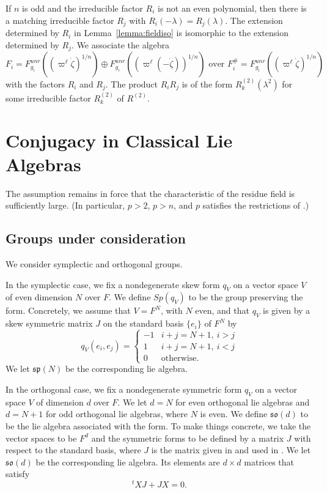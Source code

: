\documentclass[11pt]{amsart}
\theoremstyle{definition}
\theoremstyle{remark}
\numberwithin{equation}{theorem}
\def\lie#1{{\mathfrak{#1}}}
\def\lb{\text{\#}}
\begin{document}
If $n$ is odd and the irreducible factor $R_i$ is not an even
polynomial, then there is a matching irreducible factor $R_j$ with
$R_i(-\lambda)=R_j(\lambda)$.  The extension determined by $R_i$
in Lemma~\ref{lemma:fieldiso} is isomorphic to the extension
determined by $R_j$. We associate the algebra
   \begin{equation}
   F_i = F^{unr}_{g_i}((\varpi^\ell\dot\zeta)^{1/n})\oplus
   F^{unr}_{g_i}((\varpi^\ell(-\dot\zeta))^{1/n})\text{ over }
   F_i^\lb = F^{unr}_{g_i}((\varpi^\ell\dot\zeta)^{1/n})
   \end{equation}
with the factors $R_i$ and $R_j$.  The product $R_i R_j$ is of the
form $R^{(2)}_k(\lambda^2)$ for some irreducible factor
$R^{(2)}_k$ of $R^{(2)}$.

\section{Conjugacy in Classical Lie Algebras}\label{section: conjugacy}


The assumption remains in force that the characteristic of the
residue field is sufficiently large. (In particular, $p>2$, $p>n$,
and $p$ satisfies the restrictions of \cite{WA}.)

\subsection{Groups under consideration}

We consider symplectic and orthogonal groups.

In the symplectic case, we fix a nondegenerate skew form $q_V$ on
a vector space $V$ of even dimension $N$ over $F$.  We define
$Sp(q_V)$ to be the group preserving the form.  Concretely, we
assume that $V=F^N$, with $N$ even, and that $q_V$ is given by a
skew symmetric matrix $J$ on the standard basis $\{e_i\}$ of $F^N$
by
   \begin{equation}
     q_V(e_i,e_j)=\begin{cases}
      -1 & i+j=N+1,\ i>j\\
      1  & i+j=N+1,\ i<j\\
      0 & \text{otherwise}.
      \end{cases}
   \end{equation}
We let $\lie{sp}(N)$ be the corresponding lie algebra.

In the orthogonal case, we fix a nondegenerate symmetric form
$q_V$ on a vector space $V$ of dimension $d$ over $F$.  We let
$d=N$ for even orthogonal lie algebras and $d=N+1$ for odd
orthogonal lie algebras, where $N$ is even.  We define
$\lie{so}(d)$ to be the lie algebra associated with the form.  To
make things concrete, we take the vector spaces to be $F^d$ and
the symmetric forms to be defined by a matrix $J$ with respect to
the standard basis, where $J$ is the matrix given in \cite{WA} and
used in \cite{VTF}. We let $\lie{so}(d)$ be the corresponding lie
algebra. Its elements are $d\times d$ matrices that satisfy
   \begin{equation}
   {}^tX J + J X  = 0.
   \label{eqn:lie-relation}
   \end{equation}
\end{document}
